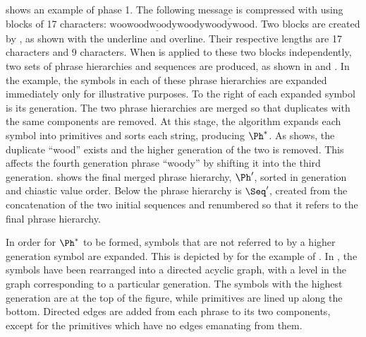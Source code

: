  shows an example of \remerge phase 
1. The following message is compressed with \repair using blocks
of 17 characters:  $\underline{\text{woowoodwoodywoody}}
\overline{\text{woodywood}}$.  
Two blocks are created by \repair, as shown with the underline and
overline.  Their respective lengths are 17 characters and 9 
characters.  When \repair is applied to these two blocks 
independently, two sets of phrase hierarchies and sequences are
produced, as shown in  and 
.
In the example, the symbols in each of these phrase 
hierarchies are expanded immediately only for illustrative 
purposes.   
To the right of each expanded symbol 
is its generation.  The two phrase hierarchies are
merged so that duplicates with the same components are
removed.  At this stage, the algorithm expands each
symbol into primitives and sorts each string, producing
$\Ph^*$.  As  shows,
the duplicate ``wood'' exists and the higher generation of
the two is removed.  This affects the fourth generation phrase
``woody'' by shifting it into the third generation.  
 shows the final merged
phrase hierarchy, $\Ph'$, sorted in generation and 
chiastic value order.  Below the phrase hierarchy is 
$\Seq'$, created from the concatenation of the two
initial sequences and renumbered so that it refers to the
final phrase hierarchy.


In order for $\Ph^*$ to be formed, symbols that are not 
referred to by a higher generation symbol are expanded.  This
is depicted by  for
the example of .
In , the symbols
have been rearranged into a directed acyclic graph, with a
level in the graph corresponding to a particular generation.
The symbols with the highest generation are at the top of the
figure, while primitives are lined up along the bottom.
Directed edges are added from each phrase to its two 
components, except for the primitives which have no edges 
emanating from them.  

